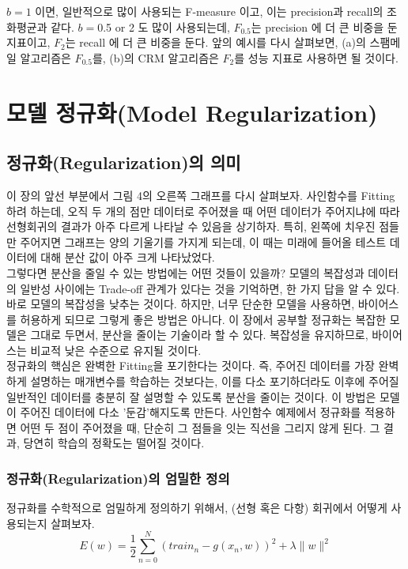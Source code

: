 \documentclass[a4paper]{oblivoir}
\begin{document}
\indent $b=1$ 이면, 일반적으로 많이 사용되는 F-measure 이고, 이는 precision과 recall의 조화평균과 같다. $b=$0.5 or 2 도 많이 사용되는데, $F_{0.5}$는 precision 에 더 큰 비중을 둔 지표이고, $F_{2}$는 recall 에 더 큰 비중을 둔다. 앞의 예시를 다시 살펴보면, (a)의 스팸메일 알고리즘은 $F_{0.5}$를, (b)의 CRM 알고리즘은 $F_{2}$를 성능 지표로 사용하면 될 것이다.

\section{모델 정규화(Model Regularization)}

\subsection{정규화(Regularization)의 의미}
이 장의 앞선 부분에서 그림 4의 오른쪽 그래프를 다시 살펴보자. 사인함수를 Fitting 하려 하는데, 오직 두 개의 점만 데이터로 주어졌을 때 어떤 데이터가 주어지냐에 따라 선형회귀의 결과가 아주 다르게 나타날 수 있음을 상기하자. 특히, 왼쪽에 치우진 점들만 주어지면 그래프는 양의 기울기를 가지게 되는데, 이 때는 미래에 들어올 테스트 데이터에 대해 분산 값이 아주 크게 나타났었다. \\
\indent 그렇다면 분산을 줄일 수 있는 방법에는 어떤 것들이 있을까? 모델의 복잡성과 데이터의 일반성 사이에는 Trade-off 관계가 있다는 것을 기억하면, 한 가지 답을 알 수 있다. 바로 모델의 복잡성을 낮추는 것이다. 하지만, 너무 단순한 모델을 사용하면, 바이어스를 허용하게 되므로 그렇게 좋은 방법은 아니다. 이 장에서 공부할 정규화는 복잡한 모델은 그대로 두면서, 분산을 줄이는 기술이라 할 수 있다. 복잡성을 유지하므로, 바이어스는 비교적 낮은 수준으로 유지될 것이다. \\
\indent 정규화의 핵심은 완벽한 Fitting을 포기한다는 것이다. 즉, 주어진 데이터를 가장 완벽하게 설명하는 매개변수를 학습하는 것보다는, 이를 다소 포기하더라도 이후에 주어질 일반적인 데이터를 충분히 잘 설명할 수 있도록 분산을 줄이는 것이다. 이 방법은 모델이 주어진 데이터에 다소 '둔감'해지도록 만든다. 사인함수 예제에서 정규화를 적용하면 어떤 두 점이 주어졌을 때, 단순히 그 점들을 잇는 직선을 그리지 않게 된다. 그 결과, 당연히 학습의 정확도는 떨어질 것이다.

\subsubsection{정규화(Regularization)의 엄밀한 정의}
정규화를 수학적으로 엄밀하게 정의하기 위해서, (선형 혹은 다항) 회귀에서 어떻게 사용되는지 살펴보자.
\begin{equation}
E(w) = \frac{1}{2}\sum_{n=0}^{N}\left(train_{n} - g(x_{n}, w) \right)^{2} + \lambda \|w\|^{2} \tag{6-12}
\end{equation}
\end{document}
